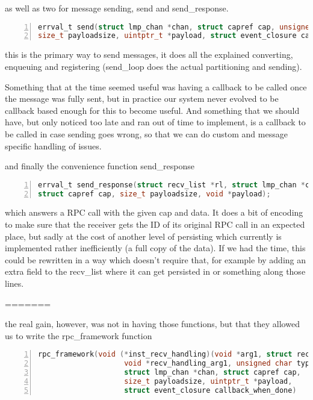 as well as two for message sending, send and send\_response.

\begin{lstlisting}[caption={send}, 
label=lst:allocation, numbers=left, stepnumber=1, float, floatplacement=tl, 
frame=tb, language=c]
errval_t send(struct lmp_chan *chan, struct capref cap, unsigned char type,
size_t payloadsize, uintptr_t *payload, struct event_closure callback_when_done, unsigned char id);
\end{lstlisting}
this is the primary way to send messages, it does all the explained converting, enqueuing and registering (send\_loop does the actual partitioning and sending).

Something that at the time seemed useful was having a callback to be called once the message was fully sent, but in practice our system never evolved to be callback based enough for this to become useful. 
And something that we should have, but only noticed too late and ran out of time to implement, is a callback to be called in case sending goes wrong, so that we can do custom and message specific handling of issues.

and finally the convenience function send\_response


\begin{lstlisting}[caption={send\_response}, 
label=lst:allocation, numbers=left, stepnumber=1, float, floatplacement=tl, 
frame=tb, language=c]
errval_t send_response(struct recv_list *rl, struct lmp_chan *chan,
struct capref cap, size_t payloadsize, void *payload);
\end{lstlisting}


which answers a RPC call with the given cap and data. It does a bit of encoding to make sure that the receiver gets the ID of its original RPC call in an expected place, but sadly at the cost of another level of persisting which currently is implemented rather inefficiently (a full copy of the data). If we had the time, this could be rewritten in a way which doesn't require that, for example by adding an extra field to the recv\_list where it can get persisted in or something along those lines.

=======

the real gain, however, was not in having those functions, but that they allowed us to write the rpc\_framework function


\begin{lstlisting}[caption={rpc\_framework}, 
label=lst:allocation, numbers=left, stepnumber=1, float, floatplacement=tl, 
frame=tb, language=c]
rpc_framework(void (*inst_recv_handling)(void *arg1, struct recv_list *data),
					void *recv_handling_arg1, unsigned char type,
					struct lmp_chan *chan, struct capref cap, 
					size_t payloadsize, uintptr_t *payload,
					struct event_closure callback_when_done)
\end{lstlisting}

